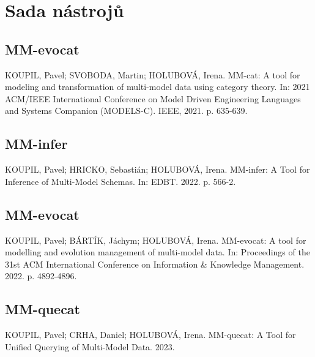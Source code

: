 
\chapter{Sada nástrojů}

\section{MM-evocat}

KOUPIL, Pavel; SVOBODA, Martin; HOLUBOVÁ, Irena. MM-cat: A tool for modeling and transformation of multi-model data using category theory. In: 2021 ACM/IEEE International Conference on Model Driven Engineering Languages and Systems Companion (MODELS-C). IEEE, 2021. p. 635-639.


\section{MM-infer}

KOUPIL, Pavel; HRICKO, Sebastián; HOLUBOVÁ, Irena. MM-infer: A Tool for Inference of Multi-Model Schemas. In: EDBT. 2022. p. 566-2.


\section{MM-evocat}

KOUPIL, Pavel; BÁRTÍK, Jáchym; HOLUBOVÁ, Irena. MM-evocat: A tool for modelling and evolution management of multi-model data. In: Proceedings of the 31st ACM International Conference on Information \& Knowledge Management. 2022. p. 4892-4896.


\section{MM-quecat}

KOUPIL, Pavel; CRHA, Daniel; HOLUBOVÁ, Irena. MM-quecat: A Tool for Unified Querying of Multi-Model Data. 2023.
